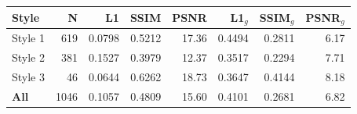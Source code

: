 \begin{tabular}{lrrrrrrr}
\toprule
Style & N & L1 & SSIM & PSNR & L1$_{g}$ & SSIM$_{g}$ & PSNR$_{g}$ \\
\midrule
Style 1 & 619 & 0.0798 & 0.5212 & 17.36 & 0.4494 & 0.2811 & 6.17 \\
Style 2 & 381 & 0.1527 & 0.3979 & 12.37 & 0.3517 & 0.2294 & 7.71 \\
Style 3 & 46 & 0.0644 & 0.6262 & 18.73 & 0.3647 & 0.4144 & 8.18 \\
\textbf{All} & 1046 & 0.1057 & 0.4809 & 15.60 & 0.4101 & 0.2681 & 6.82 \\
\bottomrule
\end{tabular}
